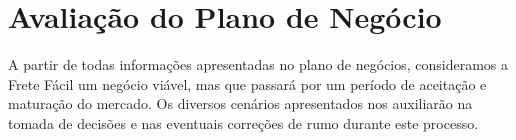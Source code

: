 \chapter{Avaliação do Plano de Negócio}

A partir de todas informações apresentadas no plano de negócios, consideramos a Frete Fácil um negócio viável, mas que passará por um período de aceitação e maturação do mercado. Os diversos cenários apresentados nos auxiliarão na tomada de decisões e nas eventuais correções de rumo durante este processo.
